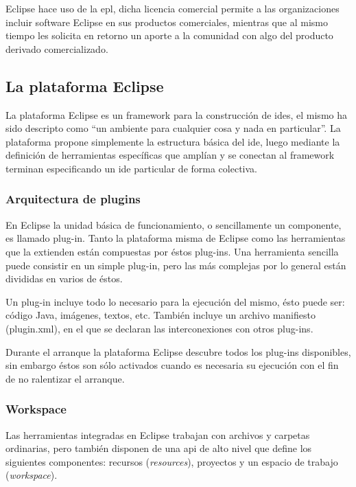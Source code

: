\documentclass[a4paper,12pt,oneside,spanish]{book}
\begin{document}
\textsf{Eclipse} hace uso de la \gls{epl}, dicha licencia comercial permite a las organizaciones incluir software \textsf{Eclipse} en sus productos comerciales, mientras que al mismo tiempo les solicita en retorno un aporte a la comunidad con algo del producto derivado comercializado.


\subsection{La plataforma Eclipse}
\label{subsec:PlatEclipse}

La plataforma \textsf{Eclipse} es un framework para la construcción de \glspl{ide}, el mismo ha sido descripto como ``un ambiente para cualquier cosa y nada en particular''. La plataforma propone simplemente la estructura básica del \gls{ide}, luego mediante la definición de herramientas específicas que amplían y se conectan al framework terminan especificando un \gls{ide} particular de forma colectiva.


\subsubsection{Arquitectura de plugins}

En \textsf{Eclipse} la unidad básica de funcionamiento, o sencillamente un componente, es llamado plug-in. Tanto la plataforma misma de \textsf{Eclipse} como las herramientas que la extienden están compuestas por éstos plug-ins. Una herramienta sencilla puede consistir en un simple plug-in, pero las más complejas por lo general están divididas en varios de éstos.

Un plug-in incluye todo lo necesario para la ejecución del mismo, ésto puede ser: código \textsf{Java}, imágenes, textos, etc. También incluye un archivo manifiesto (\textsf{plugin.xml}), en el que se declaran las interconexiones con otros plug-ins.

Durante el arranque la plataforma \textsf{Eclipse} descubre todos los plug-ins disponibles, sin embargo éstos son sólo activados cuando es necesaria su ejecución con el fin de no ralentizar el arranque.


\subsubsection{Workspace}

Las herramientas integradas en \textsf{Eclipse} trabajan con archivos y carpetas ordinarias, pero también disponen de una \gls{api} de alto nivel que define los siguientes componentes: recursos (\textit{resources}), proyectos y un espacio de trabajo (\textit{workspace}).
\end{document}
